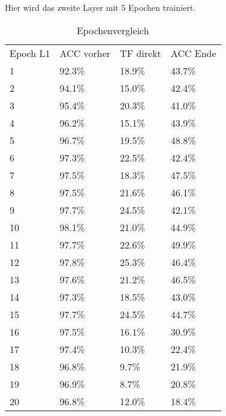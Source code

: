     Hier wird das zweite Layer mit 5 Epochen trainiert.
    \begin{table}[h!]
        \begin{center}
            \caption{Epochenvergleich}
            \label{tab3:Table}
            \begin{tabular}{l|l|l|l}
                Epoch L1 & ACC vorher & TF direkt & ACC Ende \\
                1 & 92.3\% & 18.9\% & 43.7\% \\
                2 & 94.1\% & 15.0\% & 42.4\% \\
                3 & 95.4\% & 20.3\% & 41.0\% \\
                4 & 96.2\% & 15.1\% & 43.9\% \\
                5 & 96.7\% & 19.5\% & 48.8\% \\
                6 & 97.3\% & 22.5\% & 42.4\% \\
                7 & 97.5\% & 18.3\% & 47.5\% \\
                8 & 97.5\% & 21.6\% & 46.1\% \\
                9 & 97.7\% & 24.5\% & 42.1\% \\
                10 & 98.1\% & 21.0\% & 44.9\% \\
                11 & 97.7\% & 22.6\% & 49.9\% \\
                12 & 97.8\% & 25.3\% & 46.4\% \\
                13 & 97.6\% & 21.2\% & 46.5\% \\
                14 & 97.3\% & 18.5\% & 43.0\% \\
                15 & 97.7\% & 24.5\% & 44.7\% \\
                16 & 97.5\% & 16.1\% & 30.9\% \\
                17 & 97.4\% & 10.3\% & 22.4\% \\
                18 & 96.8\% & 9.7\% & 21.9\% \\
                19 & 96.9\% & 8.7\% & 20.8\% \\
                20 & 96.8\% & 12.0\% & 18.4\% \\
            \end{tabular}
        \end{center}
    \end{table}

